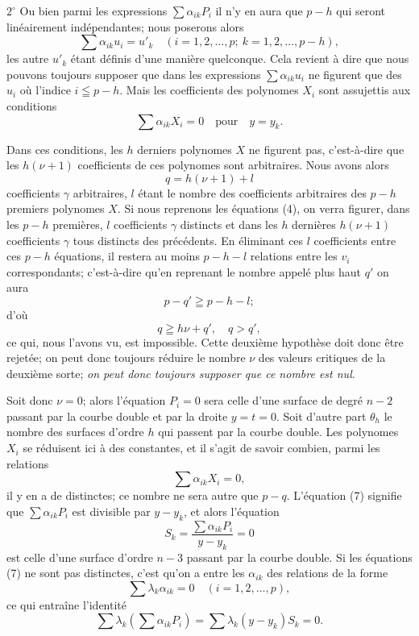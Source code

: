 \documentclass{article}
\begin{document}
$2^\circ$ Ou bien parmi les expressions $\displaystyle\sum \alpha_{ik} P_{i}$ il n'y en aura que $p - h$ qui seront linéairement indépendantes; nous poserons alors
\[
\sum \alpha_{ik} u_{i} = u'_{k} \quad (i = 1, 2, \ldots, p; \ k = 1, 2, \ldots, p - h),
\]
les autre $u'_{k}$ étant définis d'une manière quelconque. Cela revient à dire que nous pouvons toujours supposer que dans les expressions $\displaystyle\sum \alpha_{ik} u_{i}$ ne figurent que des $u_{i}$ où l'indice $i \leqq p - h$. Mais les coefficients des polynomes $X_{i}$ sont assujettis aux conditions
\[
\sum \alpha_{ik} X_{i} = 0 \quad \text{pour} \quad y = y_{k}.
\]

Dans ces conditions, les $h$ derniers polynomes $X$ ne figurent pas, c'est-à-dire que les $h(\nu + 1)$ coefficients de ces polynomes sont
arbitraires. Nous avons alors
\[
q = h(\nu + 1) + l
\]
coefficients $\gamma$ arbitraires, $l$ étant le nombre des coefficients arbitraires des $p - h$ premiers polynomes $X$. Si nous reprenons les équations (4), on verra figurer, dans les $p - h$ premières, $l$ coefficients $\gamma$ distincts et dans les $h$ dernières $h(\nu + 1)$ coefficients $\gamma$ tous distincts des précédents. En éliminant ces $l$ coefficients entre ces $p - h$ équations, il restera au moins $p - h - l$ relations entre les $v_{i}$ correspondants; c'est-à-dire qu'en reprenant le nombre appelé plus haut $q'$ on aura
\[
p - q' \geqq p - h - l;
\]
d'où
\[
q \geqq h\nu + q', \quad q > q',
\]
ce qui, nous l'avons vu, est impossible. Cette deuxième hypothèse doit donc être rejetée; on peut donc toujours réduire le nombre $\nu$ des valeurs critiques de la deuxième sorte; \emph{on peut donc toujours supposer que ce nombre est nul}.

Soit donc $\nu = 0$; alors l'équation $P_{i} = 0$ sera celle d'une surface de degré $n - 2$ passant par la courbe double et par la droite $y = t = 0$. Soit d'autre part $\theta_{h}$ le nombre des surfaces d'ordre $h$ qui passent par la courbe double. Les polynomes $X_{i}$ se réduisent ici à des constantes, et il s'agit de savoir combien, parmi les relations
\[
\sum \alpha_{ik} X_{i} = 0, \tag{7}
\]
il y en a de distinctes; ce nombre ne sera autre que $p - q$. L'équation (7) signifie que $\displaystyle\sum \alpha_{ik} P_{i}$ est divisible par $y - y_{k}$, et alors l'équation
\[
S_{k} = \frac{\sum \alpha_{ik} P_{i}}{y - y_{k}} = 0
\]
est celle d'une surface d'ordre $n - 3$ passant par la courbe double. Si les équations (7) ne sont pas distinctes, c'est qu'on a entre les $\alpha_{ik}$
des relations de la forme
\[
\sum \lambda_{k}\alpha_{ik} = 0 \quad (i = 1, 2, \ldots, p), \tag{8}
\]
ce qui entraîne l'identité
\[
\sum \lambda_{k}\left(\sum \alpha_{ik} P_{i}\right) = \sum \lambda_{k}(y - y_{k}) S_{k} = 0. \tag{9}
\]
\end{document}

